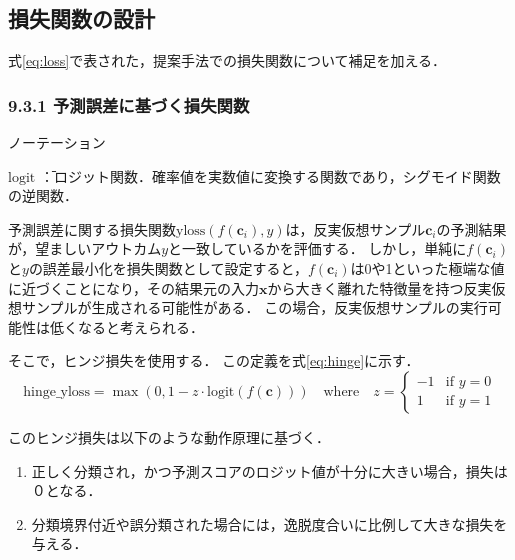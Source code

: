 \documentclass[dvipdfmx]{jreport}
\begin{document}
\subsection{損失関数の設計}
式\eqref{eq:loss}で表された，提案手法での損失関数について補足を加える．
\subsubsection{9.3.1 予測誤差に基づく損失関数}
\begin{itembox}[l]{\large{ノーテーション}}
    \begin{tabbing}
        \hspace{15pt} \raisebox{0.5ex}{\tiny $\bullet$} $\text{logit}$ \=：ロジット関数．確率値を実数値に変換する関数であり，シグモイド関数の逆関数．
    \end{tabbing}
\end{itembox}
 
予測誤差に関する損失関数$\text{yloss}(f(\bm{c}_i), y)$は，反実仮想サンプル$\bm{c}_i$の予測結果が，望ましいアウトカム$y$と一致しているかを評価する．
しかし，単純に$f(\bm{c}_i)$と$y$の誤差最小化を損失関数として設定すると，$f(\bm{c}_i)$は0や1といった極端な値に近づくことになり，その結果元の入力$\bm{x}$から大きく離れた特徴量を持つ反実仮想サンプルが生成される可能性がある．
この場合，反実仮想サンプルの実行可能性は低くなると考えられる．

そこで，ヒンジ損失を使用する．
この定義を式\eqref{eq:hinge}に示す．
\begin{equation}
    \text{hinge\_yloss} = \max(0, 1 - z \cdot \text{logit}(f(\bm{c})))
    \quad \text{where} \quad
    z = \begin{cases}
    -1 & \text{if } y = 0 \\
    1 & \text{if } y = 1
    \end{cases}    \label{eq:hinge}
\end{equation}

このヒンジ損失は以下のような動作原理に基づく．
\begin{tcolorbox}[title=\textbf{ヒンジ損失の性質}]
    \begin{enumerate}
        \item 正しく分類され，かつ予測スコアのロジット値が十分に大きい場合，損失は０となる．
        \item 分類境界付近や誤分類された場合には，逸脱度合いに比例して大きな損失を与える．
    \end{enumerate}
\end{tcolorbox}
\end{document}
